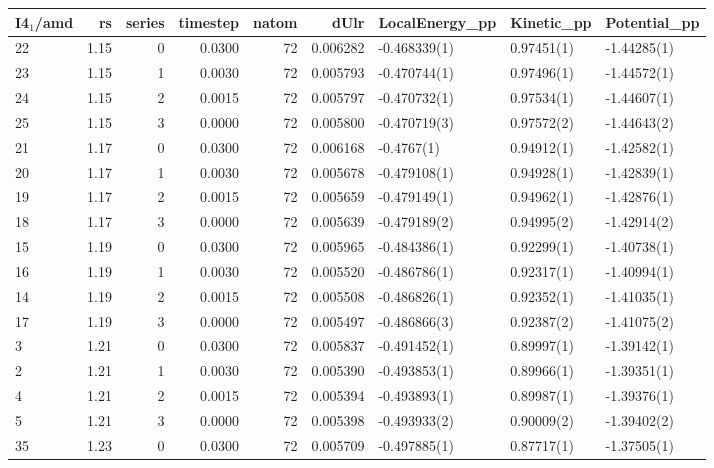 \begin{tabular}{lrrrrrlll}
\toprule
I4$_1$/amd &    rs &  series &  timestep &  natom &      dUlr & LocalEnergy\_pp &  Kinetic\_pp & Potential\_pp \\
\midrule
22 &  1.15 &       0 &    0.0300 &     72 &  0.006282 &   -0.468339(1) &  0.97451(1) &  -1.44285(1) \\
23 &  1.15 &       1 &    0.0030 &     72 &  0.005793 &   -0.470744(1) &  0.97496(1) &  -1.44572(1) \\
24 &  1.15 &       2 &    0.0015 &     72 &  0.005797 &   -0.470732(1) &  0.97534(1) &  -1.44607(1) \\
25 &  1.15 &       3 &    0.0000 &     72 &  0.005800 &   -0.470719(3) &  0.97572(2) &  -1.44643(2) \\
21 &  1.17 &       0 &    0.0300 &     72 &  0.006168 &     -0.4767(1) &  0.94912(1) &  -1.42582(1) \\
20 &  1.17 &       1 &    0.0030 &     72 &  0.005678 &   -0.479108(1) &  0.94928(1) &  -1.42839(1) \\
19 &  1.17 &       2 &    0.0015 &     72 &  0.005659 &   -0.479149(1) &  0.94962(1) &  -1.42876(1) \\
18 &  1.17 &       3 &    0.0000 &     72 &  0.005639 &   -0.479189(2) &  0.94995(2) &  -1.42914(2) \\
15 &  1.19 &       0 &    0.0300 &     72 &  0.005965 &   -0.484386(1) &  0.92299(1) &  -1.40738(1) \\
16 &  1.19 &       1 &    0.0030 &     72 &  0.005520 &   -0.486786(1) &  0.92317(1) &  -1.40994(1) \\
14 &  1.19 &       2 &    0.0015 &     72 &  0.005508 &   -0.486826(1) &  0.92352(1) &  -1.41035(1) \\
17 &  1.19 &       3 &    0.0000 &     72 &  0.005497 &   -0.486866(3) &  0.92387(2) &  -1.41075(2) \\
3  &  1.21 &       0 &    0.0300 &     72 &  0.005837 &   -0.491452(1) &  0.89997(1) &  -1.39142(1) \\
2  &  1.21 &       1 &    0.0030 &     72 &  0.005390 &   -0.493853(1) &  0.89966(1) &  -1.39351(1) \\
4  &  1.21 &       2 &    0.0015 &     72 &  0.005394 &   -0.493893(1) &  0.89987(1) &  -1.39376(1) \\
5  &  1.21 &       3 &    0.0000 &     72 &  0.005398 &   -0.493933(2) &  0.90009(2) &  -1.39402(2) \\
35 &  1.23 &       0 &    0.0300 &     72 &  0.005709 &   -0.497885(1) &  0.87717(1) &  -1.37505(1) \\

\end{tabular}
